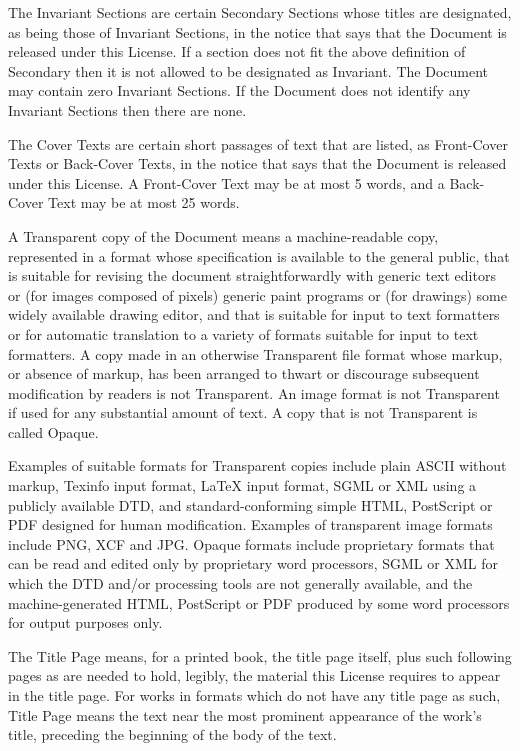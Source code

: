 \documentclass[10pt,english]{article}
\begin{document}
The \textquotedbl{}Invariant Sections\textquotedbl{} are certain Secondary
Sections whose titles are designated, as being those of Invariant
Sections, in the notice that says that the Document is released under
this License. If a section does not fit the above definition of Secondary
then it is not allowed to be designated as Invariant. The Document
may contain zero Invariant Sections. If the Document does not identify
any Invariant Sections then there are none.

The \textquotedbl{}Cover Texts\textquotedbl{} are certain short passages
of text that are listed, as Front-Cover Texts or Back-Cover Texts,
in the notice that says that the Document is released under this License.
A Front-Cover Text may be at most 5 words, and a Back-Cover Text may
be at most 25 words.

A \textquotedbl{}Transparent\textquotedbl{} copy of the Document means
a machine-readable copy, represented in a format whose specification
is available to the general public, that is suitable for revising
the document straightforwardly with generic text editors or (for images
composed of pixels) generic paint programs or (for drawings) some
widely available drawing editor, and that is suitable for input to
text formatters or for automatic translation to a variety of formats
suitable for input to text formatters. A copy made in an otherwise
Transparent file format whose markup, or absence of markup, has been
arranged to thwart or discourage subsequent modification by readers
is not Transparent. An image format is not Transparent if used for
any substantial amount of text. A copy that is not \textquotedbl{}Transparent\textquotedbl{}
is called \textquotedbl{}Opaque\textquotedbl{}.

Examples of suitable formats for Transparent copies include plain
ASCII without markup, Texinfo input format, \LaTeX{} input format,
SGML or XML using a publicly available DTD, and standard-conforming
simple HTML, PostScript or PDF designed for human modification. Examples
of transparent image formats include PNG, XCF and JPG. Opaque formats
include proprietary formats that can be read and edited only by proprietary
word processors, SGML or XML for which the DTD and/or processing tools
are not generally available, and the machine-generated HTML, PostScript
or PDF produced by some word processors for output purposes only.

The \textquotedbl{}Title Page\textquotedbl{} means, for a printed
book, the title page itself, plus such following pages as are needed
to hold, legibly, the material this License requires to appear in
the title page. For works in formats which do not have any title page
as such, \textquotedbl{}Title Page\textquotedbl{} means the text near
the most prominent appearance of the work's title, preceding the beginning
of the body of the text.
\end{document}
